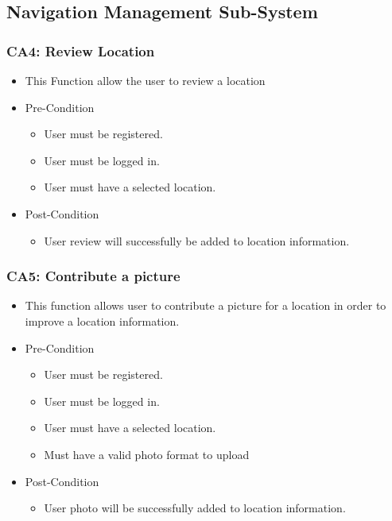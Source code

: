 \documentclass[12pt,a4paper]{article}
\begin{document}
	\subsection{Navigation Management Sub-System}
		\subsubsection{CA4: Review Location}
			\begin{itemize}
				\item This Function allow the user to review a location
				\item Pre-Condition
					\begin{itemize}
						\item User must be registered.
						\item User must be logged in.
						\item User must have a selected location.
					\end{itemize}
				\item Post-Condition
					\begin{itemize}
						\item User review will successfully be added to location information.
					\end{itemize}
			\end{itemize}
		\subsubsection{CA5: Contribute a picture}
			\begin{itemize}
				\item This function allows user to contribute a picture for a location in order to improve a location information.
				\item Pre-Condition
					\begin{itemize}
						\item User must be registered.
						\item User must be logged in.
						\item User must have a selected location.
						\item Must have a valid photo format to upload
					\end{itemize}
				\item Post-Condition
					\begin{itemize}
						\item User photo will be successfully added to location information.
					\end{itemize}
			\end{itemize}
\end{document}
